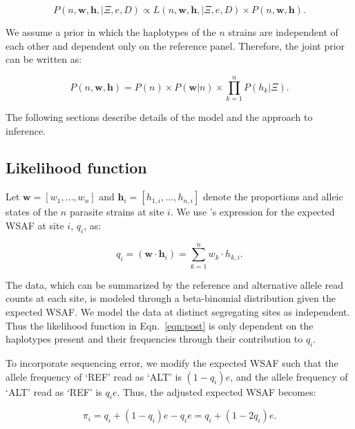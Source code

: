 \documentclass{nature}
\begin{document}
\begin{equation}
P(n, \mathbf{w}, \mathbf{h}, | \Xi, e, D) \propto L(n, \mathbf{w}, \mathbf{h}, | \Xi, e, D) \times P(n, \mathbf{w}, \mathbf{h}). \label{eqn:post}
\end{equation}

\noindent We assume a prior in which the haplotypes of the $n$ strains are independent of each other and dependent only on the reference panel.  Therefore, the joint prior can be written as:

\begin{equation}
P(n, \mathbf{w}, \mathbf{h}) = P(n) \times P(\mathbf{w} | n) \times \prod_{k=1}^{n} P(h_k | \Xi).
\end{equation}

\noindent The following sections describe details of the model and the approach to inference.


\subsection*{Likelihood function}

Let $\mathbf w = [w_1,\dots, w_n]$ and $\mathbf{h}_i = [h_{1,i},\dots,h_{n,i}]$ denote the proportions and alleic states of the $n$ parasite strains at site $i$. We use \cite{Jack2016}'s expression for the expected WSAF at site $i$, $q_{i}$, as:

\begin{equation}
q_i= (\mathbf{w}\cdot\mathbf{h}_{i})  =  \sum_{k=1}^{n} w_k \cdot h_{k,i} .\label{eqn:qij_full_sum}
\end{equation}

\noindent The data, which can be summarized by the reference and alternative allele read counts at each site, is modeled through a beta-binomial distribution given the expected WSAF.  We model the data at distinct segregating sites as independent.  Thus the likelihood function  in Eqn.~\eqref{eqn:post} is only dependent on the haplotypes present and their frequencies through their contribution to $q_{i}$.


To incorporate sequencing error, we modify the expected WSAF such that the allele frequency of `REF' read as `ALT' is $(1 - q_i)e$, and the allele frequency of `ALT' read as `REF' is $q_ie$. Thus, the adjusted expected WSAF becomes:

\begin{equation}
\pi_i = q_i + (1 - q_i)e - q_ie = q_i + (1 - 2q_i)e.\label{eqn:adj_q}
\end{equation}
\end{document}
